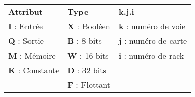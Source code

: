 \begin{tabular}{l|l|l}
\textbf{\color{green}Attribut}  & \textbf{\color{red}Type} & \textbf{\color{blue}k.j.i}\\%
%
\textbf{I} : Entrée             & \textbf{X} : Booléen      &  \textbf{k} : numéro de voie\\%
\textbf{Q} : Sortie             & \textbf{B} : 8 bits       &  \textbf{j} : numéro de carte\\%
\textbf{M} : Mémoire            & \textbf{W} : 16 bits      &  \textbf{i} : numéro de rack\\%
\textbf{K} : Constante          & \textbf{D} : 32 bits      &  \\%
                               & \textbf{F} : Flottant     &  \\%
\end{tabular} 

